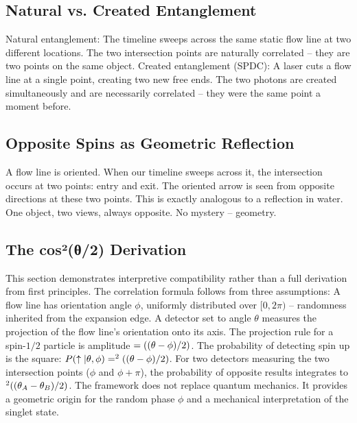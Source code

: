 \documentclass[11pt,a4paper]{article}
\let\cos\relax \let\sin\relax \let\tan\relax \let\exp\relax \let\log\relax
\def\frac#1#2{#1/#2} \def\phantom#1{} \def\ensuremath#1{#1}
\def\texorpdfstring#1#2{#2}
\begin{document}
\subsection{Natural vs. Created Entanglement}
Natural entanglement: The timeline sweeps across the same static flow line at two different locations. The two intersection points are naturally correlated -- they are two points on the same object. Created entanglement (SPDC): A laser cuts a flow line at a single point, creating two new free ends. The two photons are created simultaneously and are necessarily correlated -- they were the same point a moment before.

\subsection{Opposite Spins as Geometric Reflection}
A flow line is oriented. When our timeline sweeps across it, the intersection occurs at two points: entry and exit. The oriented arrow is seen from opposite directions at these two points. This is exactly analogous to a reflection in water. One object, two views, always opposite. No mystery -- geometry.

\subsection{The \texorpdfstring{$\cos^2(\theta/2)$}{cos²(θ/2)} Derivation}
This section demonstrates interpretive compatibility rather than a full derivation from first principles. The correlation formula follows from three assumptions: A flow line has orientation angle $\phi$, uniformly distributed over $[0, 2\pi)$ -- randomness inherited from the expansion edge. A detector set to angle $\theta$ measures the projection of the flow line's orientation onto its axis. The projection rule for a spin-$\frac{1}{2}$ particle is amplitude $= \cos((\theta-\phi)/2)$. The probability of detecting spin up is the square: $P(\uparrow|\theta, \phi) = \cos^2((\theta-\phi)/2)$. For two detectors measuring the two intersection points ($\phi$ and $\phi+\pi$), the probability of opposite results integrates to $\cos^2((\theta_A - \theta_B)/2)$. The framework does not replace quantum mechanics. It provides a geometric origin for the random phase $\phi$ and a mechanical interpretation of the singlet state.
\end{document}
